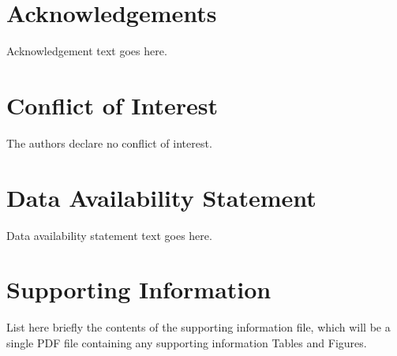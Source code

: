 \documentclass[a4paper, 11pt]{article}
\begin{document}
	\section*{Acknowledgements}
	Acknowledgement text goes here.
	
	\section*{Conflict of Interest}
	The authors declare no conflict of interest.
	
	\section*{Data Availability Statement}
	Data availability statement text goes here.
	
	
	
	
	\section*{Supporting Information}
	List here briefly the contents of the supporting information file, which will be a single PDF file containing any supporting information Tables and Figures.
	
\end{document}
